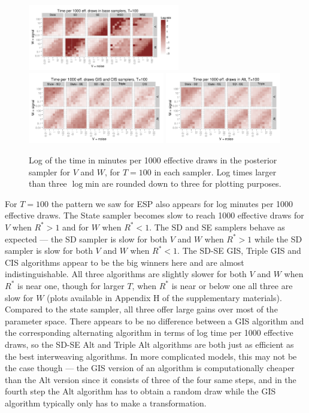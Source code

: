 \documentclass[12pt]{article}
\begin{document}
\begin{figure}[!h]
\centering
\includegraphics[width=0.59\textwidth]{basecistimeplot100}
\includegraphics[width=0.53\textwidth]{altgisVtimeplot100}
\includegraphics[width=0.45\textwidth]{altgisWtimeplot100}
\caption{Log of the time in minutes per 1000 effective draws in the posterior sampler for $V$ and $W$, for $T=100$ in each sampler. Log times larger than three $\log \mathrm{min}$ are rounded down to three for plotting purposes.}
\label{baseinttimeplot}
\end{figure}

For $T=100$ the pattern we saw for ESP also appears for log minutes per 1000 effective draws. The State sampler becomes slow to reach 1000 effective draws for $V$ when $R^*>1$ and for $W$ when $R^*<1$. The SD and SE samplers behave as expected --- the SD sampler is slow for both $V$ and $W$ when $R^*>1$ while the SD sampler is slow for both $V$ and $W$ when $R^*<1$. The SD-SE GIS, Triple GIS and CIS algorithms appear to be the big winners here and are almost indistinguishable. All three algorithms are slightly slower for both $V$ and $W$ when $R^*$ is near one, though for larger $T$,  when $R^*$ is near or below one all three are slow for $W$ (plots available in Appendix H of the supplementary materials). Compared to the state sampler, all three offer large gains over most of the parameter space. There appears to be no difference between a GIS algorithm and the corresponding alternating algorithm in terms of log time per 1000 effective draws, so the SD-SE Alt and Triple Alt algorithms are both just as efficient as the best interweaving algorithms. In more complicated models, this may not be the case though --- the GIS version of an algorithm is computationally cheaper than the Alt version since it consists of three of the four same steps, and in the fourth step the Alt algorithm has to obtain a random draw while the GIS algorithm typically only has to make a transformation.
\end{document}
